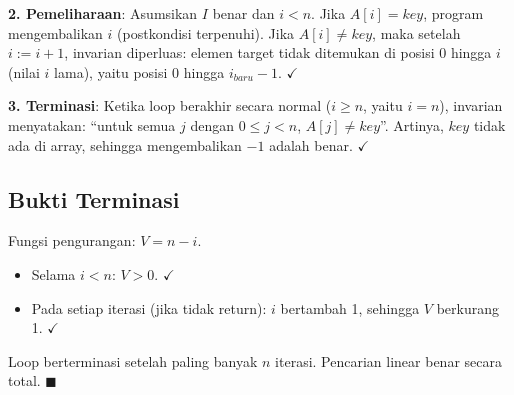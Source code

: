 \textbf{2. Pemeliharaan}: Asumsikan $I$ benar dan $i < n$. Jika $A[i] = key$, program mengembalikan $i$ (postkondisi terpenuhi). Jika $A[i] \neq key$, maka setelah $i := i + 1$, invarian diperluas: elemen target tidak ditemukan di posisi $0$ hingga $i$ (nilai $i$ lama), yaitu posisi $0$ hingga $i_{baru} - 1$. $\checkmark$

\textbf{3. Terminasi}: Ketika loop berakhir secara normal ($i \geq n$, yaitu $i = n$), invarian menyatakan: ``untuk semua $j$ dengan $0 \leq j < n$, $A[j] \neq key$''. Artinya, $key$ tidak ada di array, sehingga mengembalikan $-1$ adalah benar. $\checkmark$

\subsection{Bukti Terminasi}

Fungsi pengurangan: $V = n - i$.
\begin{itemize}
    \item Selama $i < n$: $V > 0$. $\checkmark$
    \item Pada setiap iterasi (jika tidak return): $i$ bertambah 1, sehingga $V$ berkurang 1. $\checkmark$
\end{itemize}

Loop berterminasi setelah paling banyak $n$ iterasi. Pencarian linear benar secara total. $\blacksquare$
